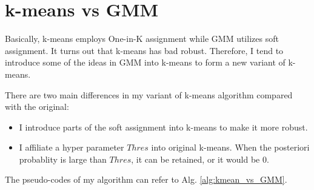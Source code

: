 \documentclass[12pt,a4paper]{article}
\theoremstyle{definition}
\begin{document}
\noindent
\noindent{}

\vspace{-0.5\baselineskip}
\section{k-means vs GMM}

Basically, k-means employs One-in-K assignment while GMM utilizes soft assignment. It turns out that k-means has bad robust. Therefore, I tend to introduce some of the ideas in GMM into k-means to form a new variant of k-means.

\vspace{0.003\linewidth}
There are two main differences in my variant of k-means algorithm compared with the original:

\begin{itemize}
	\setlength{\itemsep}{0pt}
	\item I introduce parts of the soft assignment into k-means to make it more robust.
	
	\item I affiliate a hyper parameter $Thres$ into original k-means. When the posteriori probablity is large than $Thres$, it can be retained, or it would be 0.
\end{itemize}

The pseudo-codes of my algorithm can refer to Alg. \ref{alg:kmean_vs_GMM}.
\end{document}
